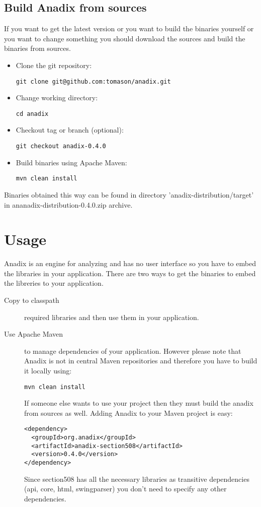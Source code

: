 \documentclass{report}
\begin{document}
\subsection{Build Anadix from sources}
If you want to get the latest version or you want to build the binaries
yourself or you want to change something you should download the sources and
build the binaries from sources.
\begin{itemize}
  \item Clone the git repository:
    \begin{verbatim}
git clone git@github.com:tomason/anadix.git
	\end{verbatim}
  \item Change working directory:
	\begin{verbatim}
cd anadix
	\end{verbatim}
  \item Checkout tag or branch (optional):
    \begin{verbatim}
git checkout anadix-0.4.0
    \end{verbatim}
  \item Build binaries using Apache Maven:
    \begin{verbatim}
mvn clean install
	\end{verbatim}
\end{itemize}
Binaries obtained this way can be found in directory
'anadix-distribution/target' in ananadix-distribution-0.4.0.zip archive.

\section{Usage}
Anadix is an engine for analyzing and has no user interface so you have to embed
the libraries in your application. There are two ways to get the binaries to
embed the libreries to your application.
\begin{description}
  \item[Copy to classpath] required libraries and then use them in your
  application.
  \item[Use Apache Maven] to manage dependencies of your application. However
  please note that Anadix is not in central Maven repositories and therefore you
  have to build it locally using:
    \begin{verbatim}
mvn clean install
	\end{verbatim}
  If someone else wants to use your project then they must build the anadix from
  sources as well.
  Adding Anadix to your Maven project is easy:
    \begin{verbatim}
<dependency>
  <groupId>org.anadix</groupId>
  <artifactId>anadix-section508</artifactId>
  <version>0.4.0</version>
</dependency>
    \end{verbatim}
  Since section508 has all the necessary libraries as transitive dependencies
  (api, core, html, swingparser) you don't need to specify any other
  dependencies.
\end{description}
\end{document}
